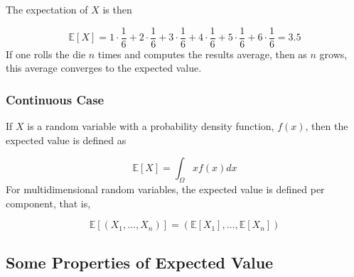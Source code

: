 The expectation of $X$ is then

\begin{equation*}
	\mathbb{E}[X]=1\cdot {\frac {1}{6}}+2\cdot {\frac {1}{6}}+3\cdot {\frac {1}{6}}+4\cdot {\frac {1}{6}}+5\cdot {\frac {1}{6}}+6\cdot {\frac {1}{6}}=3.5
\end{equation*}
If one rolls the die $n$ times and computes the results average, then as $n$ grows, this average converges to the expected value.

\subsubsection{Continuous Case}
If $X$ is a random variable with a probability density function, $f(x)$, then the expected value is defined as

\begin{equation}
\mathbb{E}[X]=\int_{\Omega}xf(x)dx
\end{equation}
For multidimensional random variables, the expected value is defined per component, that is,

\begin{equation}
\mathbb{E}[(X_{1},\ldots ,X_{n})]=(\mathbb{E} [X_{1}],\ldots ,\mathbb{E}[X_{n}])
\end{equation}

\subsection{Some Properties of Expected Value}
\label{some-properties}

